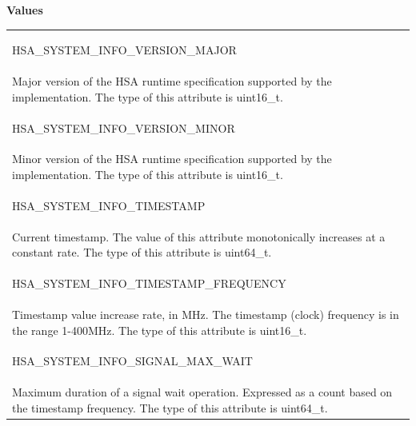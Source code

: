 \documentclass[final]{book}
\newcommand{\reftyp}[1]{#1}
\newcommand{\refenu}[1]{\reftyp{#1}}
\begin{document}
\noindent\textbf{Values}\\[-5mm]
\begin{longtable}{@{\hspace{2em}}p{\linewidth-2em}}
\hspace{-2em}\hypertarget{group__agentinfo_1gga5358716e320ad8a78b78ef44d8783b0bac33519a29a9fa32f1dd179b9f8af8243}{\refenu{HSA_\-SYSTEM_\-INFO_\-VERSION_\-MAJOR}} \\Major version of the HSA runtime specification supported by the implementation. The type of this attribute is uint16_\-t.\\[2mm]
\hspace{-2em}\hypertarget{group__agentinfo_1gga5358716e320ad8a78b78ef44d8783b0ba0ac419f557187a4cfcdeb604f37bb4ae}{\refenu{HSA_\-SYSTEM_\-INFO_\-VERSION_\-MINOR}} \\Minor version of the HSA runtime specification supported by the implementation. The type of this attribute is uint16_\-t.\\[2mm]
\hspace{-2em}\hypertarget{group__agentinfo_1gga5358716e320ad8a78b78ef44d8783b0bac9043678e4c1dd887fcf71cabee228f6}{\refenu{HSA_\-SYSTEM_\-INFO_\-TIMESTAMP}} \\Current timestamp. The value of this attribute monotonically increases at a constant rate. The type of this attribute is uint64_\-t.\\[2mm]
\hspace{-2em}\hypertarget{group__agentinfo_1gga5358716e320ad8a78b78ef44d8783b0bae2a8bb2c1322968a95b8ed49c34d54f5}{\refenu{HSA_\-SYSTEM_\-INFO_\-TIMESTAMP_\-FREQUENCY}} \\Timestamp value increase rate, in MHz. The timestamp (clock) frequency is in the range 1-400MHz. The type of this attribute is uint16_\-t.\\[2mm]
\hspace{-2em}\hypertarget{group__agentinfo_1gga5358716e320ad8a78b78ef44d8783b0ba851f3f7745ed5524352598d2a0f02e9a}{\refenu{HSA_\-SYSTEM_\-INFO_\-SIGNAL_\-MAX_\-WAIT}} \\Maximum duration of a signal wait operation. Expressed as a count based on the timestamp frequency. The type of this attribute is uint64_\-t.
\end{longtable}
\end{document}
